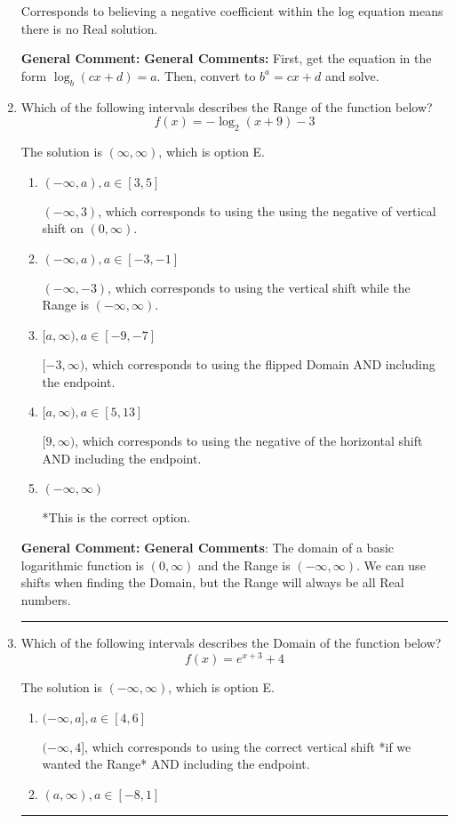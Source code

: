 \documentclass{extbook}[14pt]
\newcommand{\litem}[1]{\item #1

\rule{\textwidth}{0.4pt}}
\begin{document}
\begin{enumerate}
{\begin{enumerate}[label=\Alph*.]
Corresponds to believing a negative coefficient within the log equation means there is no Real solution.
\end{enumerate}

\textbf{General Comment:} \textbf{General Comments:} First, get the equation in the form $\log_b{(cx+d)} = a$. Then, convert to $b^a = cx+d$ and solve.
}
\litem{
Which of the following intervals describes the Range of the function below?
\[ f(x) = -\log_2{(x+9)}-3 \]

The solution is \( (\infty, \infty) \), which is option E.\begin{enumerate}[label=\Alph*.]
\item \( (-\infty, a), a \in [3, 5] \)

$(-\infty, 3)$, which corresponds to using the using the negative of vertical shift on $(0, \infty)$.
\item \( (-\infty, a), a \in [-3, -1] \)

$(-\infty, -3)$, which corresponds to using the vertical shift while the Range is $(-\infty, \infty)$.
\item \( [a, \infty), a \in [-9, -7] \)

$[-3, \infty)$, which corresponds to using the flipped Domain AND including the endpoint.
\item \( [a, \infty), a \in [5, 13] \)

$[9, \infty)$, which corresponds to using the negative of the horizontal shift AND including the endpoint.
\item \( (-\infty, \infty) \)

*This is the correct option.
\end{enumerate}

\textbf{General Comment:} \textbf{General Comments}: The domain of a basic logarithmic function is $(0, \infty)$ and the Range is $(-\infty, \infty)$. We can use shifts when finding the Domain, but the Range will always be all Real numbers.
}
\litem{
Which of the following intervals describes the Domain of the function below?
\[ f(x) = e^{x+3}+4 \]

The solution is \( (-\infty, \infty) \), which is option E.\begin{enumerate}[label=\Alph*.]
\item \( (-\infty, a], a \in [4, 6] \)

$(-\infty, 4]$, which corresponds to using the correct vertical shift *if we wanted the Range* AND including the endpoint.
\item \( (a, \infty), a \in [-8, 1] \)


\end{enumerate}}
\end{enumerate}
\end{document}
